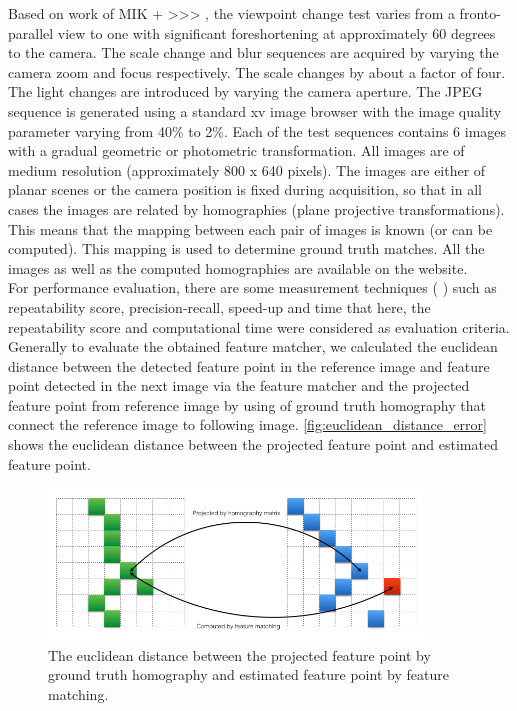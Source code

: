 Based on work of MIK + >>> \cite{mikolajczyk2005comparison}, the viewpoint change test varies from a fronto-parallel view to one with significant foreshortening at approximately 60 degrees to the camera. The scale change and blur sequences are acquired by varying the camera zoom and focus respectively. The scale changes by about a factor of four. The light changes are introduced by varying the camera aperture. The JPEG sequence is generated using a standard xv image browser with the image quality parameter varying from 40\% to 2\%. Each of the test sequences contains 6 images with a gradual geometric or photometric transformation. All images are of medium resolution (approximately 800 x 640 pixels). The images are either of planar scenes or the camera position is fixed during acquisition, so that in all cases the images are related by homographies (plane projective transformations). This means that the mapping between each pair of images is known (or can be computed). This mapping is used to determine ground truth matches. All the images as well as the computed homographies are available on the website.\\
For performance evaluation, there are some measurement techniques (\cite{mikolajczyk2005comparison} \cite{mikolajczyk2005performance}) such as repeatability score, precision-recall, speed-up and time that here, the repeatability score and computational time were considered as evaluation criteria.\\
Generally to evaluate the obtained feature matcher, we calculated the euclidean distance between the detected feature point in the reference image and feature point detected in the next image via the feature matcher and the projected feature point from reference image by using of ground truth homography that connect the reference image to following image. \autoref{fig:euclidean_distance_error} shows the euclidean distance between the projected feature point and estimated feature point.
\begin{figure}[H]
  \centering
  \includegraphics[width=100mm]{figures/euclidean_distance}
  \caption{The euclidean distance between the projected feature point by ground truth homography and estimated feature point by feature matching. }\label{fig:euclidean_distance_error}
\end{figure}


